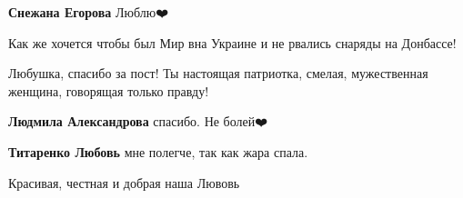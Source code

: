 \begin{itemize}
\begin{itemize}
\textbf{Снежана Егорова} Люблю❤️
\end{itemize}

 
Как же хочется чтобы был Мир вна Украине и не рвались снаряды на Донбассе!

 
Любушка, спасибо за пост! Ты настоящая патриотка, смелая, мужественная женщина, говорящая только правду!

\begin{itemize}
 
\textbf{Людмила Александрова} спасибо. Не болей❤️

 
\textbf{Титаренко Любовь} мне полегче, так как жара спала.
\end{itemize}

 
Красивая, честная и добрая наша Лювовь

 

\end{itemize}
